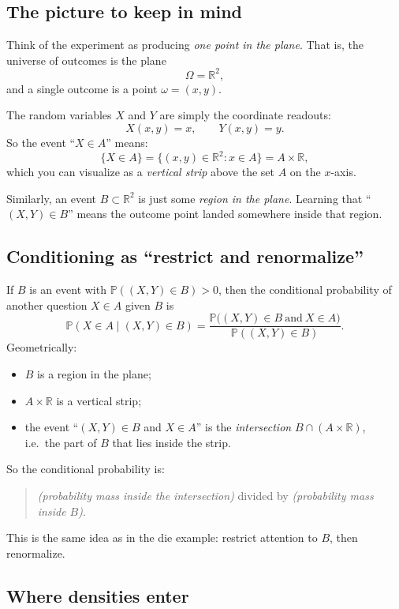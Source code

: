 \documentclass[11pt]{article}
\theoremstyle{remark}
\begin{document}
\subsection{The picture to keep in mind}

Think of the experiment as producing \emph{one point in the plane}.
That is, the universe of outcomes is the plane
\[
\Omega=\mathbb{R}^2,
\]
and a single outcome is a point \(\omega=(x,y)\).

The random variables \(X\) and \(Y\) are simply the coordinate readouts:
\[
X(x,y)=x, \qquad Y(x,y)=y.
\]
So the event ``\(X\in A\)'' means:
\[
\{X\in A\}=\{(x,y)\in\mathbb{R}^2 : x\in A\}=A\times\mathbb{R},
\]
which you can visualize as a \emph{vertical strip} above the set \(A\) on the \(x\)-axis.

Similarly, an event \(B\subset\mathbb{R}^2\) is just some \emph{region in the plane}.
Learning that ``\((X,Y)\in B\)'' means the outcome point landed somewhere inside that region.

\subsection{Conditioning as ``restrict and renormalize''}

If \(B\) is an event with \(\mathbb{P}((X,Y)\in B)>0\), then the conditional probability
of another question \(X\in A\) given \(B\) is
\[
\mathbb{P}(X\in A \mid (X,Y)\in B)
=
\frac{\mathbb{P}\big((X,Y)\in B \ \text{and}\ X\in A\big)}{\mathbb{P}((X,Y)\in B)}.
\]
Geometrically:
\begin{itemize}
\item \(B\) is a region in the plane;
\item \(A\times\mathbb{R}\) is a vertical strip;
\item the event ``\((X,Y)\in B\) and \(X\in A\)'' is the \emph{intersection} \(B\cap(A\times\mathbb{R})\),
      i.e.\ the part of \(B\) that lies inside the strip.
\end{itemize}
So the conditional probability is:
\begin{quote}
\emph{(probability mass inside the intersection)} divided by
\emph{(probability mass inside \(B\))}.
\end{quote}
This is the same idea as in the die example: restrict attention to \(B\), then renormalize.

\subsection{Where densities enter}
\end{document}
